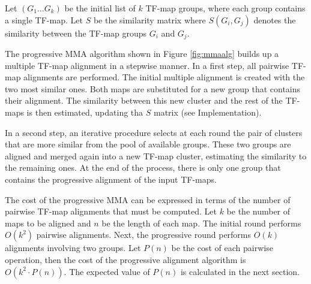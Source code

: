 
Let $(G_1 \ldots G_k)$ be the initial list of $k$ TF-map groups,
where each group contains a single TF-map. Let $S$ be the similarity 
matrix where $S(G_i,G_j)$ denotes the similarity between the TF-map 
groups $G_i$ and $G_j$.

The progressive MMA algorithm shown in Figure \ref{fig:mmaalg} builds up a multiple TF-map
alignment in a stepwise manner. In a first step, all pairwise TF-map
alignments are performed. The initial multiple alignment is created 
with the two most similar ones. Both maps are substituted for a
new group that contains their alignment. The similarity between this
new cluster and the rest of the TF-maps is then estimated, updating
tha $S$ matrix (see Implementation).

In a second step, an iterative procedure selects at each round the pair
of clusters that are more similar from the pool of available groups.
These two groups are aligned and merged again into a new TF-map cluster,
estimating the similarity to the remaining ones. At the end of the
process, there is only one group that contains the progressive alignment
of the input TF-maps.

The cost of the progressive MMA can be expressed in terms of the number
of pairwise TF-map alignments that must be computed. Let $k$ be the number
of maps to be aligned and $n$ be the length of each map. The initial round
performs $O(k^2)$ pairwise alignments. Next, the progressive round performs
$O(k)$ alignments involving two groups. Let $P(n)$ be the cost of each
pairwise operation, then the cost of the progressive alignment algorithm
is $O(k^2 \cdot P(n))$. The expected value of $P(n)$ is calculated in the
next section.



